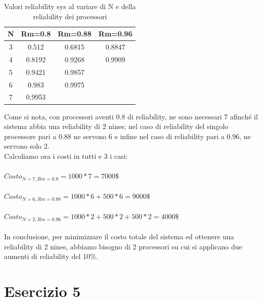 	\begin{table}[H]
		\footnotesize
		\caption{Valori reliability sys al variare di N e della reliability dei processori}
		\label{tab:rel_tab_es4}
		\centering
		\begin{tabular}{cccc}
			\toprule
			\textbf{N} & \textbf{Rm=0.8} & \textbf{Rm=0.88} & \textbf{Rm=0.96}\\
			\midrule
			3 & 0.512 & 0.6815 & 0.8847\\
			\midrule
			4 & 0.8192 & 0.9268 & 0.9909\\
			\midrule
			5 & 0.9421 & 0.9857 & \\
			\midrule
			6 & 0.983 & 0.9975 & \\
			\midrule
			7 & 0.9953 &  & \\
			\bottomrule
			
		\end{tabular}
		
	\end{table}
	Come si nota, con processori aventi 0.8 di reliability, ne sono necessari 7 afinché il sistema abbia una reliability di 2 nines; nel caso di reliability del singolo processore pari a 0.88 ne servono 6 e infine nel caso di reliability pari a 0.96, ne servono solo 2.\\
	Calcoliamo ora i costi in tutti e 3 i casi:\\\\
	$ Costo_{N=7,Rm=0.8}=1000*7=7000\$ $\\\\
	$ Costo_{N=6,Rm=0.88}=1000*6+500*6=9000\$ $\\\\
	$ Costo_{N=2,Rm=0.96}=1000*2+500*2+500*2=4000\$ $\\\\
	In conclusione, per minimizzare il costo totale del sistema ed ottenere una reliability di 2 nines, abbiamo bisogno di 2 processori su cui si applicano due aumenti di reliability del 10\%. 
	
	\section{Esercizio 5}